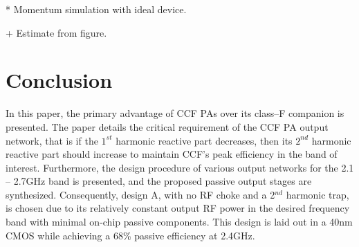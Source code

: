 \documentclass[conference]{IEEEtran}
\begin{document}
\begin{table}[!t]
\begin{threeparttable}
{\begin{tabular}{|c|c|c|c|c|c|c|}
\end{tabular}%
 }
\begin{tablenotes}
  \item[*] Momentum simulation with ideal device.
  \item[+] Estimate from figure.
  \end{tablenotes}
\end{threeparttable} 
\vspace{-0.25in}
\end{table}

\section{Conclusion}
\label{section:Conclusion}
In this paper, the primary advantage of CCF PAs over its class--F companion is presented. The paper details the critical requirement of the CCF PA output network, that is if the $1^{st}$ harmonic reactive part decreases, then its $2^{nd}$ harmonic reactive part should increase to maintain CCF's peak efficiency in the band of interest. Furthermore, the design procedure of various output networks for the 2.1 -- 2.7GHz band is presented, and the proposed passive output stages are synthesized.  Consequently, design A, with no RF choke and a 2$^{nd}$ harmonic trap, is chosen due to its relatively constant output RF power in the desired frequency band with minimal on-chip passive components. This design is laid out in a 40nm CMOS while achieving a 68\% passive efficiency at 2.4GHz.



\end{document}

